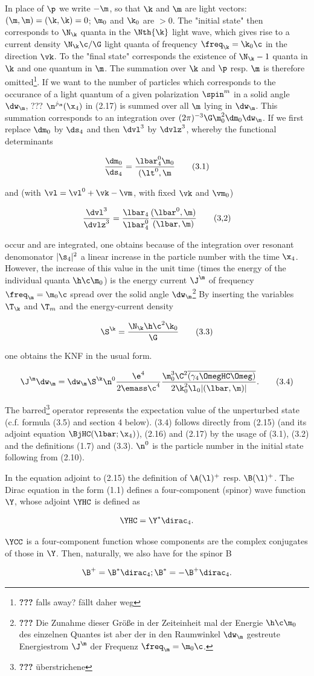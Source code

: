 \documentclass{article}
\newcommand{\WTF}[1]{\footnote{\textbf{???} #1}}
\newcommand{\nequ}[2]{
\begin{align*}
#1
\tag{#2}
\end{align*}
}
\newcommand{\uequ}[1]{
\begin{align*}
#1
\end{align*}
}
\newcommand{\CC}[1]{{#1^{*}}}
\newcommand{\HC}[1]{{#1^{+}}}
\newcommand{\barred}[1]{
\overline{#1}
}
\begin{document}
In place of $\p$ we write $-\m$, so that $\k$ and $\m$ are light vectors: $(\m, \m)=(\k,\k)=0$; $\m_0$ and $\k_0$ are $>0$. The "initial state" then corresponds to $\N_\k$ quanta in the $\Nth{\k}$ light wave, which gives rise to a current density $\N_\k \c / \G$ light quanta of frequency $\freq_{\k} = \k_0\c$ in the direction $\vk$. To the "final state" corresponds the existence of $\N_\k-1$ quanta in $\k$ and one quantum in $\m$. The summation over $\k$ and $\p$ resp. $\m$ is therefore omitted\WTF{falls away? fällt daher weg}. If we want to the number of particles which corresponds to the occurance of a light quantum of a given polarization $\spin^m$ in a solid angle $\dw_\m$, ??? $\n^{j_\m}(\x_4)$ in (2.17) is summed over all $\m$ lying in $\dw_\m$. This summation corresponds to an integration over $(2\pi)^{-3}\G\m_0^2\dm_0\dw_\m$.
If we first replace $\dm_0$ by $\ds_4$ and then $\dvl^3$ by $\dvlz^3$, whereby the functional determinants
\nequ{
\frac{\dm_0}{\ds_4}=\frac{\lbar^0_4 \m_0}{(\lt^0,\m}
}{3.1}
and (with $\vl=\vl^0+\vk-\vm$, with fixed $\vk$ and $\vm_0$)
\nequ{
\frac{\dvl^3}{\dvlz^3}=\frac{\lbar_4}{\lbar^0_4}\frac{(\lbar^0,\m)}{(\lbar,\m)}
}{3,2}
occur and are integrated, one obtains because of the integration over resonant denomonator $|\s_4|^2$ a linear increase in the particle number with the time $\x_4$. However, the increase of this value in the unit time (times the energy of the individual quanta $\h\c\m_0$) is the energy current $\J^\m$ of frequency $\freq_\m = \m_0\c$ spread over the solid angle $\dw_\m$\WTF{Die Zunahme dieser Größe in der Zeiteinheit mal der Energie $\h\c\m_0$ des einzelnen Quantes ist aber der in den Raumwinkel $\dw_\m$ gestreute Energiestrom $\J^\m$ der Frequenz $\freq_\m=\m_0\c$.} By inserting the variables $\T_\k$ and $\T_m$ and the energy-current density
\nequ{
\S^\k = \frac{\N_\k\h\c^2\k_0}{\G}
}{3.3}
one obtains the KNF in the usual form.
\nequ{
\J^\m \dw_\m = \dw_\m \S^\k \n^0 \frac{\e^4}{2\emass\c^4}\frac{\m_0^3 \C^2 \barred{(\gamma_4\OmegHC\Omeg)}}{2\k_0^2\l_0|(\lbar,\m)|}.
}{3.4}
The barred\WTF{überstrichene} operator represents the expectation value of the unperturbed state (c.f. formula (3.5) and section 4 below). (3.4) follows directly from (2.15) (and its adjoint equation $\BjHC(\lbar;\x_4)$), (2.16) and (2.17) by the usage of (3.1), (3.2) and the definitions (1.7) and (3.3). $\n^0$ is the particle number in the initial state following from (2.10).

In the equation adjoint to (2.15) the definition of $\HC{\A(\l)}$ resp. $\HC{\B(\l)}$. The Dirac equation in the form (1.1) defines a four-component (spinor) wave function $\Y$, whose adjoint $\YHC$ is defined as
\uequ{
\YHC = \CC{\Y}\dirac_4.
}
$\YCC$ is a four-component function whose components are the complex conjugates of those in $\Y$. Then, naturally, we also have for the spinor B
\uequ{
\HC{\B} = \CC{\B}\dirac_4; \CC{\B} = -\HC{\B}\dirac_4.
}
\end{document}
